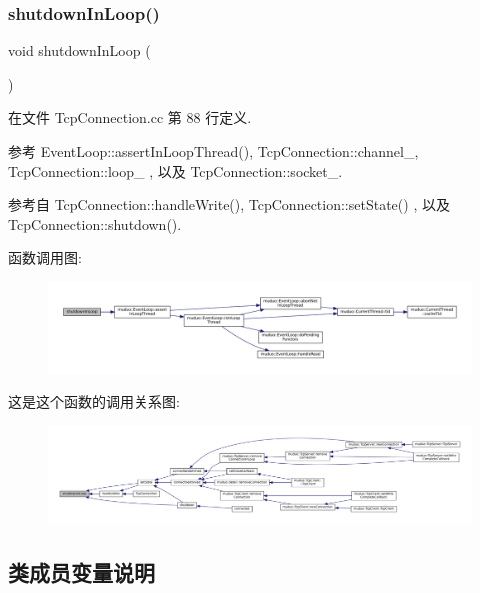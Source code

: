 \subsubsection{\texorpdfstring{shutdown\+In\+Loop()}{shutdownInLoop()}}
{\footnotesize\ttfamily void shutdown\+In\+Loop (\begin{DoxyParamCaption}{ }\end{DoxyParamCaption})\hspace{0.3cm}{\ttfamily [private]}}



在文件 Tcp\+Connection.\+cc 第 88 行定义.



参考 Event\+Loop\+::assert\+In\+Loop\+Thread(), Tcp\+Connection\+::channel\+\_\+, Tcp\+Connection\+::loop\+\_\+ , 以及 Tcp\+Connection\+::socket\+\_\+.



参考自 Tcp\+Connection\+::handle\+Write(), Tcp\+Connection\+::set\+State() , 以及 Tcp\+Connection\+::shutdown().

函数调用图\+:
\nopagebreak
\begin{figure}[H]
\begin{center}
\leavevmode
\includegraphics[width=350pt]{classmuduo_1_1TcpConnection_a4f988229386dc4e5f80cca96e096e074_cgraph}
\end{center}
\end{figure}
这是这个函数的调用关系图\+:
\nopagebreak
\begin{figure}[H]
\begin{center}
\leavevmode
\includegraphics[width=350pt]{classmuduo_1_1TcpConnection_a4f988229386dc4e5f80cca96e096e074_icgraph}
\end{center}
\end{figure}


\subsection{类成员变量说明}
\mbox{\label{classmuduo_1_1TcpConnection_a8375a127884b4155e4d0ff8604bb0b9a}} 
